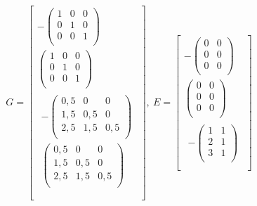 \begin{equation} \label{eq22}
\begin{split}
G = \begin{bmatrix}
 - \begin{pmatrix}
1 & 0 & 0 \\
0 & 1 & 0 \\
0 & 0 & 1 \\
\end{pmatrix} \\
\begin{pmatrix}
1 & 0 & 0 \\
0 & 1 & 0 \\
0 & 0 & 1 \\
\end{pmatrix} \\
\begin{matrix}
 - \begin{pmatrix}
0,5 & 0 & 0 \\
1,5 & 0,5 & 0 \\
2,5 & 1,5 & 0,5 \\
\end{pmatrix} \\
\begin{pmatrix}
0,5 & 0 & 0 \\
1,5 & 0,5 & 0 \\
2,5 & 1,5 & 0,5 \\
\end{pmatrix} \\
\end{matrix} \\
\end{bmatrix},\ E = \begin{bmatrix}
 - \begin{pmatrix}
0 & 0 \\
0 & 0 \\
0 & 0 \\
\end{pmatrix} \\
\begin{pmatrix}
0 & 0 \\
0 & 0 \\
0 & 0 \\
\end{pmatrix} \\
\begin{matrix}
 - \begin{pmatrix}
1 & 1 \\
2 & 1 \\
3 & 1 \\
\end{pmatrix} \\

\end{matrix}
\end{bmatrix}
\end{split}
\end{equation}
